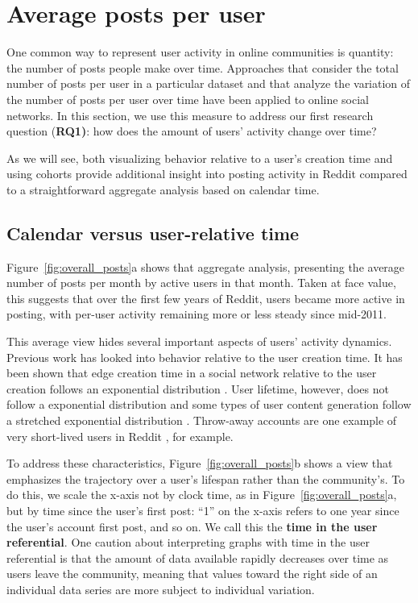 \section{Average posts per user}
One common way to represent user activity in online communities is quantity: the number of posts people make over time. Approaches that consider the total number of posts per user in a particular dataset \cite{Gruhl2004} and that analyze the variation of the number of posts per user over time \cite{Guo2009} have been applied to online social networks.  In this section, we use this measure to address our first research question (\textbf{RQ1)}: how does the amount of users' activity change over time?

As we will see, both visualizing behavior relative to a user's creation time and using cohorts provide additional insight into posting activity in Reddit compared to a straightforward aggregate analysis based on calendar time.

\subsection{Calendar versus user-relative time}

Figure~\ref{fig:overall_posts}a shows that aggregate analysis, presenting the average number of posts per month by active users in that month.  Taken at face value, this 
suggests that over the first few years of Reddit, users became more active in posting, with per-user activity remaining more or less steady since mid-2011.


This average view hides several important aspects of users' activity dynamics. Previous work has looked into behavior relative to the user creation time. It has been shown that edge creation time in a social network relative to the user creation follows an exponential distribution \cite{Tomkins2008}. User lifetime, however, does not follow a exponential distribution and some types of user content generation follow a stretched exponential distribution \cite{Guo2009}. Throw-away accounts are one example of very short-lived users in Reddit \cite{Bergstrom2011}, for example. 

To address these characteristics, Figure~\ref{fig:overall_posts}b shows a view that emphasizes the trajectory over a user's lifespan rather than the community's.  To do this, we scale the x-axis not by clock time, as in Figure~\ref{fig:overall_posts}a, but by time since the user's first post: ``1'' on the x-axis refers to one year since the user's account first post, and so on. We call this the \textbf{time in the user referential}. One caution about interpreting graphs with time in the user referential is that the amount of data available rapidly decreases over time as users leave the community, meaning that values toward the right side of an individual data series are more subject to individual variation.  

